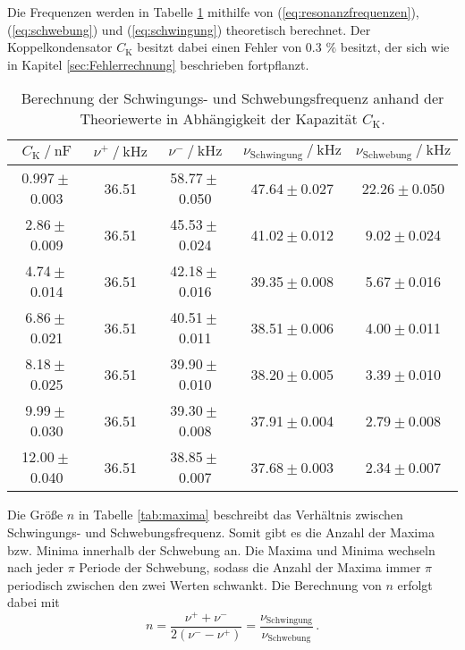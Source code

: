 Die Frequenzen werden in Tabelle \ref{tab:schwebung} mithilfe von (\ref{eq:resonanzfrequenzen}), 
(\ref{eq:schwebung}) und (\ref{eq:schwingung}) theoretisch berechnet. Der Koppelkondensator
$C_\text{K}$ besitzt dabei einen Fehler von 0.3 $\unit{\percent}$ besitzt, der sich wie in Kapitel 
\ref{sec:Fehlerrechnung} beschrieben fortpflanzt.
\begin{table}
    \centering
    \caption{   Berechnung der Schwingungs- und Schwebungsfrequenz anhand der Theoriewerte
                in Abhängigkeit der Kapazität $C_\text{K}$. }
    \label{tab:schwebung}
    \begin{tabular}{c c c c c}
        \toprule
        ${C_\text{K}} \mathbin{/} \unit{\nano\farad}$ &
        $\nu^+ \mathbin{/} \unit{\kilo\hertz}$ &
        $\nu^- \mathbin{/} \unit{\kilo\hertz}$ &
        $\nu_\text{Schwingung} \mathbin{/} \unit{\kilo\hertz}$ &
        $\nu_\text{Schwebung} \mathbin{/} \unit{\kilo\hertz}$ \\
        \midrule
         0.997${}\pm{}$0.003 &    36.51 & 58.77${}\pm{}$0.050 &    47.64${}\pm{}$0.027 &   22.26${}\pm{}$0.050 \\
          2.86${}\pm{}$0.009 &    36.51 & 45.53${}\pm{}$0.024 &    41.02${}\pm{}$0.012 &    9.02${}\pm{}$0.024 \\
          4.74${}\pm{}$0.014 &    36.51 & 42.18${}\pm{}$0.016 &    39.35${}\pm{}$0.008 &    5.67${}\pm{}$0.016 \\
          6.86${}\pm{}$0.021 &    36.51 & 40.51${}\pm{}$0.011 &    38.51${}\pm{}$0.006 &    4.00${}\pm{}$0.011 \\
          8.18${}\pm{}$0.025 &    36.51 & 39.90${}\pm{}$0.010 &    38.20${}\pm{}$0.005 &    3.39${}\pm{}$0.010 \\
          9.99${}\pm{}$0.030 &    36.51 & 39.30${}\pm{}$0.008 &    37.91${}\pm{}$0.004 &    2.79${}\pm{}$0.008 \\
         12.00${}\pm{}$0.040 &    36.51 & 38.85${}\pm{}$0.007 &    37.68${}\pm{}$0.003 &    2.34${}\pm{}$0.007 \\
        \bottomrule
    \end{tabular}
\end{table}

Die Größe $n$ in Tabelle \ref{tab:maxima} beschreibt das Verhältnis zwischen Schwingungs- und 
Schwebungsfrequenz. Somit gibt es die Anzahl der Maxima bzw. Minima innerhalb der Schwebung an. 
Die Maxima und Minima wechseln nach jeder $\pi$ Periode der Schwebung, sodass die Anzahl der Maxima
immer $\pi$ periodisch zwischen den zwei Werten schwankt. Die Berechnung von $n$ erfolgt dabei mit
\begin{equation}
    n=\frac{\nu^+ + \nu^-}{2\left(\nu^- - \nu^+\right)}=\frac{\nu_{\text{Schwingung}}}{\nu_{\text{Schwebung}}} \, .
\end{equation}

